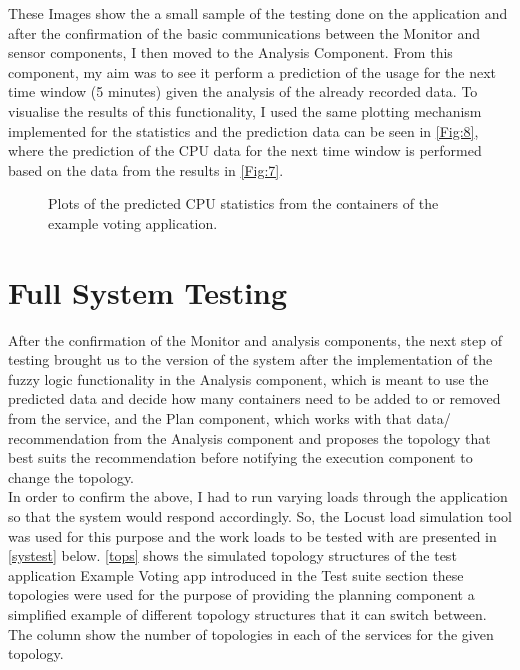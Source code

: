 These Images show the a small sample of the testing done on the application and after the confirmation of the basic communications between the Monitor and sensor components, I then moved to the Analysis Component. From this component, my aim was to see it perform a prediction of the usage for the next time window (5 minutes) given the analysis of the already recorded data. To visualise the results of this functionality, I used the same plotting mechanism implemented for the statistics and the prediction data can be seen in \autoref{Fig:8}, where the prediction of the CPU data for the next time window is performed based on the data from the results in \autoref{Fig:7}.
\begin{figure}[H]
\centering
  \hfill
  \hfill   
    \hfill
  \hfill
    \caption{Plots of the predicted CPU statistics from the containers of the example voting application.} 
   \label{Fig:8} 
\end{figure}

\section{Full System Testing }
After the confirmation of the Monitor and analysis components, the next step of testing brought us to the version of the system after the implementation of the fuzzy logic functionality in the Analysis component, which is meant to use the predicted data and decide how many containers need to be added to or removed from the service, and the Plan component, which works with that data/ recommendation from the Analysis component and proposes the topology that best suits the recommendation before notifying the execution component to change the topology.\\
In order to confirm the above, I had to run varying loads through the application so that the system would respond accordingly. So, the Locust load simulation tool was used for this purpose and the work loads to be tested with are presented in \autoref{systest} below. \autoref{tops} shows the simulated topology structures of the test application Example Voting app introduced in the Test suite section these topologies were used for the purpose of providing the planning component a simplified example of different topology structures that it can switch between. The column show the number of topologies in each of the services for the given topology.

